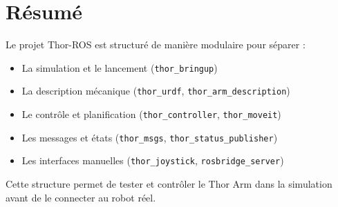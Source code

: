 \documentclass[a4paper,12pt]{article}
\numberwithin{equation}{section}
\begin{document}
\section{Résumé}
Le projet Thor-ROS est structuré de manière modulaire pour séparer :
\begin{itemize}
    \item La simulation et le lancement (\texttt{thor\_bringup})
    \item La description mécanique (\texttt{thor\_urdf}, \texttt{thor\_arm\_description})
    \item Le contrôle et planification (\texttt{thor\_controller}, \texttt{thor\_moveit})
    \item Les messages et états (\texttt{thor\_msgs}, \texttt{thor\_status\_publisher})
    \item Les interfaces manuelles (\texttt{thor\_joystick}, \texttt{rosbridge\_server})
\end{itemize}

Cette structure permet de tester et contrôler le Thor Arm dans la simulation avant de le connecter au robot réel.
\end{document}
